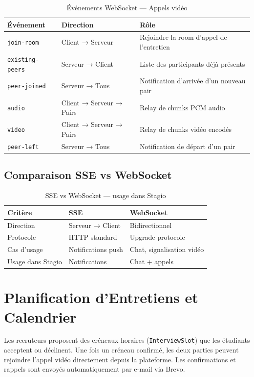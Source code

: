 ﻿\documentclass[12pt,a4paper]{report}
\newcommand{\cmark}{\ding{51}}
\begin{document}
\begin{table}[H]
\centering
\begin{tabularx}{\textwidth}{llX}
\toprule
\textbf{Événement} & \textbf{Direction} & \textbf{Rôle} \\
\midrule
\texttt{join-room} & Client → Serveur & Rejoindre la room d'appel de l'entretien \\
\texttt{existing-peers} & Serveur → Client & Liste des participants déjà présents \\
\texttt{peer-joined} & Serveur → Tous & Notification d'arrivée d'un nouveau pair \\
\texttt{audio} & Client → Serveur → Pairs & Relay de chunks PCM audio \\
\texttt{video} & Client → Serveur → Pairs & Relay de chunks vidéo encodés \\
\texttt{peer-left} & Serveur → Tous & Notification de départ d'un pair \\
\bottomrule
\end{tabularx}
\caption{Événements WebSocket — Appels vidéo}
\end{table}

\subsection{Comparaison SSE vs WebSocket}

\begin{table}[H]
\centering
\begin{tabular}{lll}
\toprule
\textbf{Critère} & \textbf{SSE} & \textbf{WebSocket} \\
\midrule
Direction & Serveur → Client & Bidirectionnel \\
Protocole & HTTP standard & Upgrade protocole \\
Cas d'usage & Notifications push & Chat, signalisation vidéo \\
Usage dans Stagio & \cmark Notifications & \cmark Chat + appels \\
\bottomrule
\end{tabular}
\caption{SSE vs WebSocket — usage dans Stagio}
\end{table}

\section{Planification d'Entretiens et Calendrier}

Les recruteurs proposent des créneaux horaires (\texttt{InterviewSlot}) que les étudiants acceptent ou déclinent. Une fois un créneau confirmé, les deux parties peuvent rejoindre l'appel vidéo directement depuis la plateforme. Les confirmations et rappels sont envoyés automatiquement par e-mail via Brevo.
\end{document}
